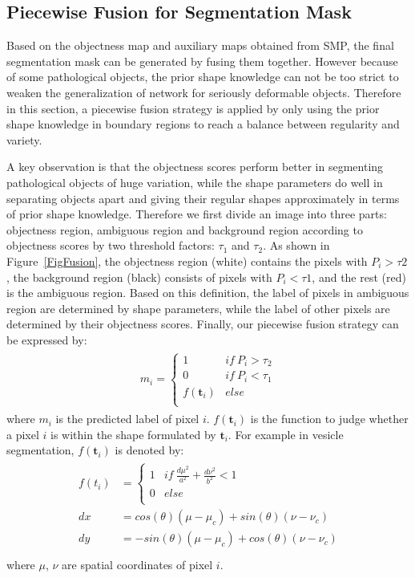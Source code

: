 \subsection{Piecewise Fusion for Segmentation Mask}
\label{sec:fusion}
Based on the objectness map and auxiliary maps obtained from SMP, the final segmentation mask can be generated by fusing them together.
However because of some pathological objects, the prior shape knowledge can not be too strict to weaken the generalization of network for seriously deformable objects.
Therefore in this section, a piecewise fusion strategy is applied by only using the prior shape knowledge in boundary regions to reach a balance between regularity and variety.

A key observation is that the objectness scores perform better in segmenting pathological objects of huge variation, while the shape parameters do well in separating objects apart and giving their regular shapes approximately in terms of prior shape knowledge.
Therefore we first divide an image into three parts: objectness region, ambiguous region and background region according to objectness scores by two threshold factors: $\tau_1$ and $\tau_2$.
As shown in Figure~\ref{FigFusion}, the objectness region (white) contains the pixels with $P_i>\tau2$, the background region (black) consists of pixels with $P_i<\tau1$, and the rest (red) is the ambiguous region.
Based on this definition, the label of pixels in ambiguous region are determined by shape parameters, while the label of other pixels are determined by their objectness scores.
Finally, our piecewise fusion strategy can be expressed by:
\begin{eqnarray}\label{fusion}
\begin{aligned}
m_i=\left\{\begin{array}{cc}
1&if~P_i>\tau_2\\
0&if~P_i<\tau_1\\
f(\mathbf{t}_i)&else\\
\end{array}\right.
\end{aligned}
\end{eqnarray}
where $m_i$ is the predicted label of pixel $i$.
$f(\mathbf{t}_i)$ is the function to judge whether a pixel $i$ is within the shape formulated by $\mathbf{t}_i$.
For example in vesicle segmentation, $f(\mathbf{t}_i)$ is denoted by:
\begin{eqnarray}\label{fusion1}
\begin{aligned}
f(t_i)&=\left\{\begin{array}{cc}
1&if~\frac{d\mu^2}{a^2}+\frac{d\nu^2}{b^2}<1\\
0&else\\
\end{array}\right.\\
dx &= cos(\theta)(\mu-\mu_c)+sin(\theta)(\nu-\nu_c)\\
dy &= -sin(\theta)(\mu-\mu_c)+cos(\theta)(\nu-\nu_c)\\
\end{aligned}
\end{eqnarray}
where $\mu$, $\nu$ are spatial coordinates of pixel $i$.

